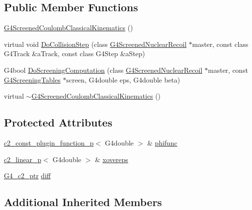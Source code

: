 \subsection*{Public Member Functions}
\begin{DoxyCompactItemize}
\item 
\hyperlink{classG4ScreenedCoulombClassicalKinematics_abd9b64d790ce2b887a7adb6707db447c}{G4\+Screened\+Coulomb\+Classical\+Kinematics} ()
\item 
virtual void \hyperlink{classG4ScreenedCoulombClassicalKinematics_a4d9894d234cdebccd4005d3a23e03db1}{Do\+Collision\+Step} (class \hyperlink{classG4ScreenedNuclearRecoil}{G4\+Screened\+Nuclear\+Recoil} $\ast$master, const class G4\+Track \&a\+Track, const class G4\+Step \&a\+Step)
\item 
G4bool \hyperlink{classG4ScreenedCoulombClassicalKinematics_a8e8d7873c4f99edac95ed00100d54844}{Do\+Screening\+Computation} (class \hyperlink{classG4ScreenedNuclearRecoil}{G4\+Screened\+Nuclear\+Recoil} $\ast$master, const \hyperlink{structG4ScreeningTables}{G4\+Screening\+Tables} $\ast$screen, G4double eps, G4double beta)
\item 
virtual \hyperlink{classG4ScreenedCoulombClassicalKinematics_ab03ecac3d449f4061534b36afb72b56f}{$\sim$\+G4\+Screened\+Coulomb\+Classical\+Kinematics} ()
\end{DoxyCompactItemize}
\subsection*{Protected Attributes}
\begin{DoxyCompactItemize}
\item 
\hyperlink{classc2__const__plugin__function__p}{c2\+\_\+const\+\_\+plugin\+\_\+function\+\_\+p}$<$ G4double $>$ \& \hyperlink{classG4ScreenedCoulombClassicalKinematics_a8f5d883788d232da756cde3342b610cc}{phifunc}
\item 
\hyperlink{classc2__linear__p}{c2\+\_\+linear\+\_\+p}$<$ G4double $>$ \& \hyperlink{classG4ScreenedCoulombClassicalKinematics_addbca9f6d5c2acb2966216b2fab20aea}{xovereps}
\item 
\hyperlink{G4ScreenedNuclearRecoil_8hh_a54f93f48440e736bf99cf574ecf80385}{G4\+\_\+c2\+\_\+ptr} \hyperlink{classG4ScreenedCoulombClassicalKinematics_adf3f28f417ca19bbb80f9341b134cd0c}{diff}
\end{DoxyCompactItemize}
\subsection*{Additional Inherited Members}


